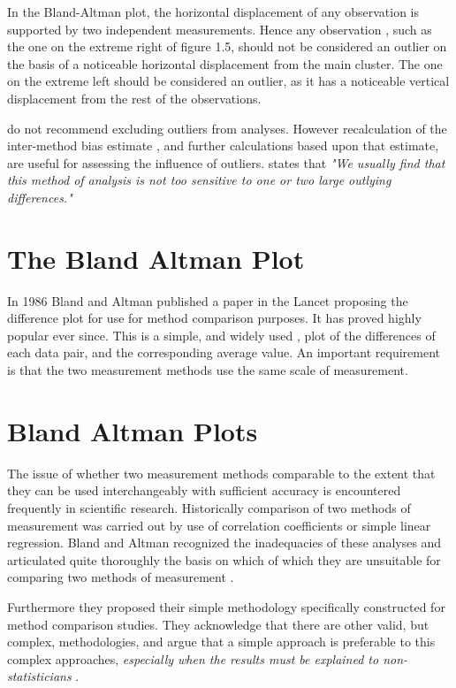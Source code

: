 \documentclass[12pt, a4paper]{report}
\theoremstyle{plain}
\theoremstyle{definition}
\theoremstyle{remark}
\begin{document}
	In the Bland-Altman plot, the horizontal displacement of any
	observation is supported by two independent measurements. Hence
	any observation , such as the one on the extreme right of figure
	1.5, should not be considered an outlier on the basis of a
	noticeable horizontal displacement from the main cluster. The one
	on the extreme left should be considered an outlier, as it has a
	noticeable vertical displacement from the rest of the
	observations.
	
	\citet*{BA99} do not recommend excluding outliers from analyses.
	However recalculation of the inter-method bias estimate , and
	further calculations based upon that estimate, are useful for
	assessing the influence of outliers.\citep{BA99} states that
	\emph{"We usually find that this method of analysis is not too
		sensitive to one or two large outlying differences."}


	\section{The Bland Altman Plot}
	In 1986 Bland and Altman published a paper in the Lancet proposing
	the difference plot for use for method comparison purposes. It has
	proved highly popular ever since. This is a simple, and widely
	used , plot of the differences of each data pair, and the
	corresponding average value. An important requirement is that the
	two measurement methods use the same scale of measurement.

	\section{Bland Altman Plots}
	The issue of whether two measurement methods comparable to the
	extent that they can be used interchangeably with sufficient
	accuracy is encountered frequently in scientific research.
	Historically comparison of two methods of measurement was carried
	out by use of correlation coefficients or simple linear
	regression. Bland and Altman recognized the inadequacies of these
	analyses and articulated quite thoroughly the basis on which of
	which they are unsuitable for comparing two methods of measurement
	\citep*{BA83}.
	
	
	Furthermore they proposed their simple methodology specifically
	constructed for method comparison studies. They acknowledge that
	there are other valid, but complex, methodologies, and argue that
	a simple approach is preferable to this complex approaches,
	\emph{especially when the results must be explained to
		non-statisticians} \citep*{BA83}.
	
\end{document}
